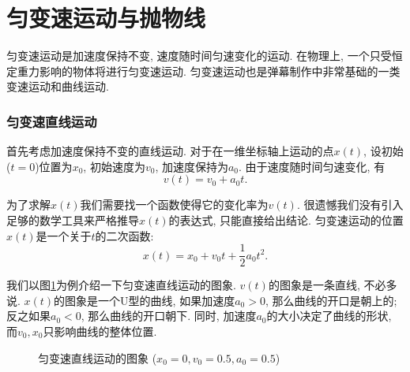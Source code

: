 \section{匀变速运动与抛物线} \label{sec:curve-parabola}

匀变速运动是加速度保持不变, 速度随时间匀速变化的运动.
在物理上, 一个只受恒定重力影响的物体将进行匀变速运动.
匀变速运动也是弹幕制作中非常基础的一类变速运动和曲线运动.

\subsubsection{匀变速直线运动}

首先考虑加速度保持不变的直线运动. 对于在一维坐标轴上运动的点$x(t)$,
设初始($t=0$)位置为$x_0$, 初始速度为$v_0$, 加速度保持为$a_0$.
由于速度随时间匀速变化, 有
\[ v(t) = v_0 + a_0 t. \]

为了求解$x(t)$我们需要找一个函数使得它的变化率为$v(t)$.
很遗憾我们没有引入足够的数学工具来严格推导$x(t)$的表达式,
只能直接给出结论. 匀变速运动的位置$x(t)$是一个关于$t$的二次函数:
\[ x(t) = x_0 + v_0 t + \dfrac12 a_0 t^2. \]

我们以图\ref{fig:acceleration}为例介绍一下匀变速直线运动的图象.
$v(t)$的图象是一条直线, 不必多说.
$x(t)$的图象是一个U型的曲线,
如果加速度$a_0>0$, 那么曲线的开口是朝上的;
反之如果$a_0<0$, 那么曲线的开口朝下.
同时, 加速度$a_0$的大小决定了曲线的形状,
而$v_0,x_0$只影响曲线的整体位置.

\begin{figure}[htbp]
  \centering
  \begin{subfigure}{0.49\textwidth}
    \centering
  \end{subfigure}
  \begin{subfigure}{0.49\textwidth}
    \centering
  \end{subfigure}
  \caption{匀变速直线运动的图象 ($x_0=0,v_0=0.5,a_0=0.5$)}
  \label{fig:acceleration}
\end{figure}

